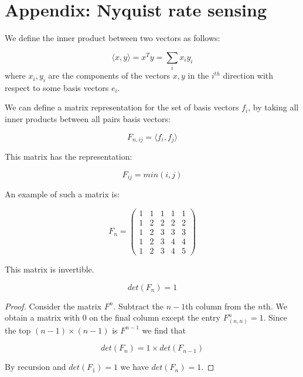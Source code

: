 \section{Appendix: Nyquist rate sensing}
We define the inner product between two vectors as follows:

\begin{definition}
\begin{equation}
\langle x, y \rangle = x^T y = \sum_i x_i y_i
\end{equation}	
where \(x_i, y_i\) are the components of the vectors \(x,y\) in the \(i^{th}\) direction with respect to some basis vectors \(e_i\).
\end{definition}

We can define a matrix representation for the set of basis vectors \(f_i\), by taking all inner products between all pairs basis vectors:

\begin{definition}
\begin{equation}
F_{n, ij} = \langle f_i, f_j \rangle
\end{equation}

This matrix has the representation:

\begin{equation}
F_{ij} = min(i,j)
\end{equation}

An example of such a matrix is:

\begin{equation}
F_n= \begin{pmatrix}
 1 & 1 & 1 & 1  & 1 \\
  1 & 2 & 2 & 2  & 2\\
     1 & 2 & 3 & 3  & 3  \\
    1 & 2 & 3 & 4  & 4  \\
     1 & 2 & 3 & 4  & 5 
\end{pmatrix}
\end{equation}
\end{definition}

This matrix is invertible.

\begin{theorem}
\begin{equation}
det(F_n) = 1
\end{equation}
\end{theorem}
\begin{proof}
Consider the matrix \(F^n\). Subtract the \(n-1\)th column from the \(n\)th. We obtain a matrix with \(0\) on the final column except the entry \(F^n_(n,n) = 1\). Since the top \((n-1) \times (n-1)\) is \(F^{n-1}\) we find that 

\begin{equation}
det(F_n) = 1 \times det(F_{n-1})
\end{equation} 

By recursion and \(det(F_1) = 1\) we have \(det(F_n) = 1\).

\end{proof}

